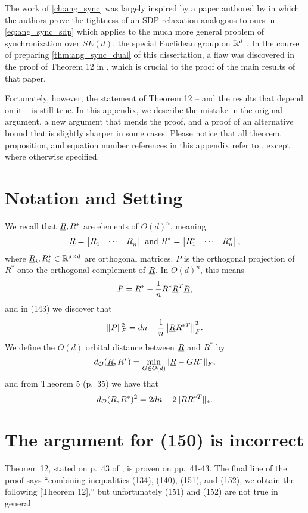 The work of \cref{ch:ang_sync} was largely inspired by a paper authored by \citeauthor*{bandeira2016se_sync} in which the authors prove the tightness of an SDP relaxation analogous to ours in \eqref{eq:ang_sync_sdp} which applies to the much more general problem of synchronization over $SE(d)$, the special Euclidean group on $\mathbb{R}^d$ \cite{bandeira2016se_sync}.  In the course of preparing \cref{thm:ang_sync_dual} of this dissertation, a flaw was discovered in the proof of Theorem 12 in \cite{bandeira2016se_sync}, which is crucial to the proof of the main results of that paper.

Fortunately, however, the statement of Theorem 12 -- and the results that depend on it -- is still true.  In this appendix, we describe the mistake in the original argument, a new argument that mends the proof, and a proof of an alternative bound that is slightly sharper in some cases.  Please notice that all theorem, proposition, and equation number references in this appendix refer to \cite{bandeira2016se_sync}, except where otherwise specified.

\section{Notation and Setting}
\label{sec:se_sync_notation}

We recall that $\underline{R}, R^*$ are elements of $O(d)^n$, meaning \[\underline{R} = \begin{bmatrix} \underline{R}_1 & \cdots & \underline{R}_n \end{bmatrix} \ \text{and} \ R^* = \begin{bmatrix} R^*_1 & \cdots & R^*_n \end{bmatrix},\] where $\underline{R}_i, R^*_i \in \mathbb{R}^{d \times d}$ are orthogonal matrices.  $P$ is the orthogonal projection of $R^*$ onto the orthogonal complement of $\underline{R}$.  In $O(d)^n$, this means \[P = R^* - \frac{1}{n} R^* \underline{R}^T \underline{R},\] and in (143) we discover that \[\norm{P}_F^2 = dn - \frac{1}{n} \norm*{\uR R^{*T}}_F^2.\]  We define the $O(d)$ orbital distance between $\underline{R}$ and $R^*$ by \[d_{\mathcal{O}}(\underline{R}, R^*) = \min_{G \in O(d)} \lVert\underline{R} - G R^*\rVert_F,\] and from Theorem 5 (p.~35) we have that \[d_{\mathcal{O}}(\underline{R}, R^*)^2 = 2 d n - 2 \lVert\underline{R} R^{*T}\rVert_*.\]

\section{The argument for (150) is incorrect}
\label{sec:incorrect}
Theorem 12, stated on p.~43 of \cite{bandeira2016se_sync}, is proven on pp.~41-43.  The final line of the proof says ``combining inequalities (134), (140), (151), and (152), we obtain the following [Theorem 12],'' but unfortunately (151) and (152) are not true in general.

